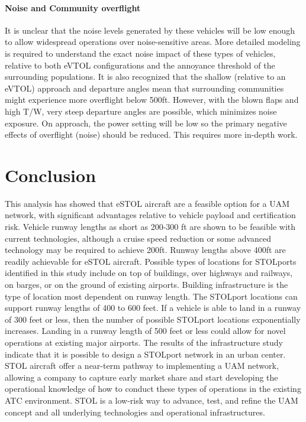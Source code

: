 \documentclass[]{aiaa-tc}%
\begin{document}
\paragraph{Noise and Community overflight} It is unclear that the noise levels generated by these vehicles will be low enough to allow widespread operations over noise-sensitive areas. More detailed modeling is required to understand the exact noise impact of these types of vehicles, relative to both eVTOL configurations and the annoyance threshold of the surrounding populations.  It is also recognized that the shallow (relative to an eVTOL) approach and departure angles mean that surrounding communities might experience more overflight below 500ft.  However, with the blown flaps and high T/W, very steep departure angles are possible, which minimizes noise exposure.  On approach, the power setting will be low so the primary negative effects of overflight (noise) should be reduced.  This requires more in-depth work. 

\section{Conclusion}
This analysis has showed that eSTOL aircraft are a feasible option for a UAM network, with significant advantages relative to vehicle payload and certification risk.  Vehicle runway lengths as short as 200-300 ft are shown to be feasible with current technologies, although a cruise speed reduction or some advanced technology may be required to achieve 200ft.   Runway lengths above 400ft are readily achievable for eSTOL aircraft. 
Possible types of locations for STOLports identified in this study include on top of buildings, over highways and railways, on barges, or on the ground of existing airports. Building infrastructure is the type of location most dependent on runway length. The STOLport locations can support runway lengths of 400 to 600 feet. If a vehicle is able to land in a runway of 300 feet or less, then the number of possible STOLport locations exponentially increases. Landing in a runway length of 500 feet or less could allow for novel operations at existing major airports. The results of the infrastructure study indicate that it is possible to design a STOLport network in an urban center.
STOL aircraft offer a near-term pathway to implementing a UAM network, allowing a company to capture early market share and start developing the operational knowledge of how to conduct these types of operations in the existing ATC environment.  STOL is a low-risk way to advance, test, and refine the UAM concept and all underlying technologies and operational infrastructures.  


\end{document}
